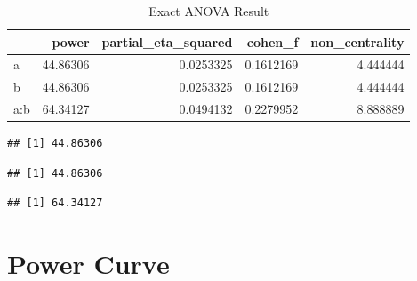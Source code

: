 \documentclass[
]{book}
\newenvironment{Shaded}{\begin{snugshade}}{\end{snugshade}}
\newcommand{\CommentTok}[1]{\textcolor[rgb]{0.56,0.35,0.01}{\textit{#1}}}
\newcommand{\FunctionTok}[1]{\textcolor[rgb]{0.00,0.00,0.00}{#1}}
\newcommand{\NormalTok}[1]{#1}
\newcommand{\OtherTok}[1]{\textcolor[rgb]{0.56,0.35,0.01}{#1}}
\newcommand{\SpecialCharTok}[1]{\textcolor[rgb]{0.00,0.00,0.00}{#1}}
\begin{document}
\begin{table}[!h]

\caption{\label{tab:unnamed-chunk-277}Exact ANOVA Result}
\centering
\begin{tabular}[t]{l|r|r|r|r}
\hline
  & power & partial\_eta\_squared & cohen\_f & non\_centrality\\
\hline
a & 44.86306 & 0.0253325 & 0.1612169 & 4.444444\\
\hline
b & 44.86306 & 0.0253325 & 0.1612169 & 4.444444\\
\hline
a:b & 64.34127 & 0.0494132 & 0.2279952 & 8.888889\\
\hline
\end{tabular}
\end{table}

\begin{Shaded}
\end{Shaded}

\begin{verbatim}
## [1] 44.86306
\end{verbatim}

\begin{Shaded}
\end{Shaded}

\begin{verbatim}
## [1] 44.86306
\end{verbatim}

\begin{Shaded}
\end{Shaded}

\begin{verbatim}
## [1] 64.34127
\end{verbatim}

\hypertarget{power-curve}{%
\chapter{Power Curve}\label{power-curve}}
\end{document}
